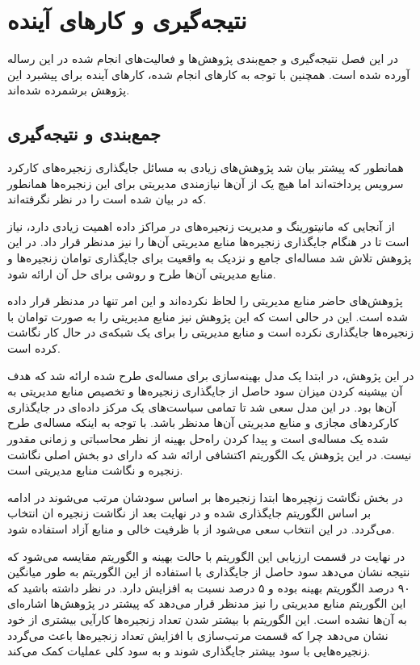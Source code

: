 \chapter{نتیجه‌گیری و کارهای آینده}

در این فصل نتیجه‌گیری و جمع‌بندی پژوهش‌ها و فعالیت‌های انجام شده
در این رساله آورده شده است.
همچنین با توجه به کارهای انجام شده،
کارهای آینده برای پیشبرد این پژوهش برشمرده شده‌اند.

\section{جمع‌بندی و نتیجه‌گیری}

همانطور که پیشتر بیان شد پژوهش‌های زیادی به مسائل جایگذاری
زنجیره‌های کارکرد سرویس پرداخته‌اند
اما هیچ یک از آن‌ها نیازمندی مدیریتی برای این زنجیره‌ها همانطور که در
\cite{ETSI-MAN}
بیان شده است را در نظر نگرفته‌اند.

از آنجایی که مانیتورینگ و مدیریت زنجیره‌های در مراکز داده اهمیت زیادی دارد،
نیاز است تا در هنگام جایگذاری زنجیره‌ها منابع مدیریتی آن‌ها را نیز مدنظر قرار داد.
در این پژوهش تلاش شد مساله‌ای جامع و نزدیک به واقعیت برای جایگذاری توامان زنجیره‌ها و منابع مدیریتی
آن‌ها طرح و روشی برای حل آن ارائه شود.

پژوهش‌های حاضر منابع مدیریتی را لحاظ نکرده‌اند و این امر تنها در \cite{AbuLebdeh2017}
مدنظر قرار داده شده است.
این در حالی است که این پژوهش نیز منابع مدیریتی را به صورت توامان با زنجیره‌ها جایگذاری نکرده است
و منابع مدیریتی را برای یک شبکه‌ی در حال کار نگاشت کرده است.

در این پژوهش، در ابتدا یک مدل بهینه‌سازی
برای مساله‌ی طرح شده ارائه شد که هدف آن بیشینه کردن میزان سود حاصل از جایگذاری زنجیره‌ها
و تخصیص منابع مدیریتی به آن‌ها بود.
در این مدل سعی شد تا تمامی سیاست‌های یک مرکز داده‌ای در جایگذاری کارکردهای مجازی
و منابع مدیریتی آن‌ها مدنظر باشد.
با توجه به اینکه مساله‌ی طرح شده یک مساله‌ی 
است و پیدا کردن راه‌حل بهینه از نظر محاسباتی
و زمانی مقدور نیست.
در این پژوهش یک الگوریتم اکتشافی ارائه شد که دارای دو بخش اصلی
نگاشت زنجیره و نگاشت منابع مدیریتی است.

در بخش نگاشت زنچیره‌ها ابتدا زنجیره‌ها بر اساس سودشان مرتب می‌شوند
در ادامه بر اساس الگوریتم
\cite{Bari2015}
جایگذاری شده و در نهایت بعد از نگاشت زنجیره
ان انتخاب می‌گردد. در این انتخاب سعی می‌شود از 
با ظرفیت خالی و منابع آزاد استفاده شود.

در نهایت در قسمت ارزیابی این الگوریتم با حالت بهینه و الگوریتم
\cite{Bari2015}
مقایسه می‌شود که نتیجه نشان می‌دهد سود حاصل از جایگذاری با استفاده از این الگوریتم
به طور میانگین ۹۰ درصد الگوریتم بهینه بوده و ۵ درصد نسبت به \cite{Bari2015}
افزایش دارد.
در نظر داشته باشید که این الگوریتم منابع مدیریتی را نیز مدنظر قرار می‌دهد
که پیشتر در پژوهش‌ها اشاره‌ای به آن‌ها نشده است.
این الگوریتم با بیشتر شدن تعداد زنجیره‌ها کارآیی بیشتری از خود نشان می‌دهد
چرا که قسمت مرتب‌سازی با افزایش تعداد زنجیره‌ها باعث می‌گردد زنجیره‌هایی با سود بیشتر جایگذاری شوند و به سود کلی عملیات کمک می‌کند.

